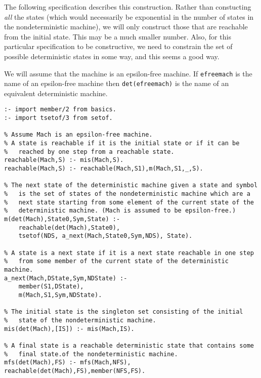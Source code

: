The following specification describes this construction.  Rather than
constucting {\em all} the states (which would necessarily be
exponential in the number of states in the nondeterministic machine),
we will only construct those that are reachable from the initial
state.  This may be a much smaller number.  Also, for this particular
specification to be constructive, we need to constrain the set of
possible deterministic states in some way, and this seems a good way.

We will assume that the machine is an epsilon-free machine.  If
\verb|efreemach| is the name of an epsilon-free machine then
\verb|det(efreemach)| is the name of an equivalent deterministic
machine. 

\begin{verbatim}
:- import member/2 from basics.
:- import tsetof/3 from setof.

% Assume Mach is an epsilon-free machine.
% A state is reachable if it is the initial state or if it can be 
%   reached by one step from a reachable state.
reachable(Mach,S) :- mis(Mach,S).
reachable(Mach,S) :- reachable(Mach,S1),m(Mach,S1,_,S).

% The next state of the deterministic machine given a state and symbol
%   is the set of states of the nondeterministic machine which are a 
%   next state starting from some element of the current state of the
%   deterministic machine. (Mach is assumed to be epsilon-free.)
m(det(Mach),State0,Sym,State) :- 
    reachable(det(Mach),State0),
    tsetof(NDS, a_next(Mach,State0,Sym,NDS), State).

% A state is a next state if it is a next state reachable in one step
%   from some member of the current state of the deterministic machine.
a_next(Mach,DState,Sym,NDState) :- 
    member(S1,DState),
    m(Mach,S1,Sym,NDState).

% The initial state is the singleton set consisting of the initial 
%   state of the nondeterministic machine.
mis(det(Mach),[IS]) :- mis(Mach,IS).

% A final state is a reachable deterministic state that contains some
%   final state.of the nondeterministic machine.
mfs(det(Mach),FS) :- mfs(Mach,NFS), reachable(det(Mach),FS),member(NFS,FS).
\end{verbatim}

